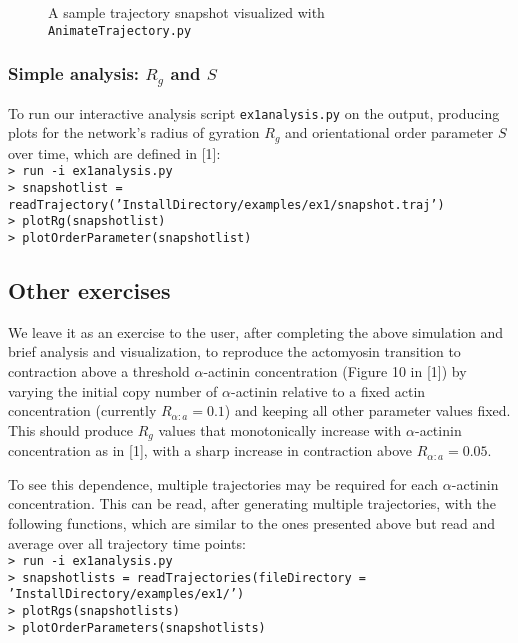 \documentclass[11pt, oneside]{article}   	%
\begin{document}
\begin{figure}[h]
\caption{A sample trajectory snapshot visualized with \texttt{AnimateTrajectory.py}}
\centering
\end{figure}

\subsubsection{Simple analysis: $R_g$ and $S$}

To run our interactive analysis script \texttt{ex1analysis.py} on the output, producing plots for the network's radius of gyration $R_g$ and orientational order parameter $S$ over time, which are defined in [1]:\\

\indent \texttt{> run -i ex1analysis.py}\\
\indent \texttt{> snapshotlist = readTrajectory('InstallDirectory/examples/ex1/snapshot.traj')}\\
\indent \texttt{> plotRg(snapshotlist)}\\
\indent \texttt{> plotOrderParameter(snapshotlist)}\\

\subsection{Other exercises}

We leave it as an exercise to the user, after completing the above simulation and brief analysis and visualization, to reproduce the actomyosin transition to contraction above a threshold $\alpha$-actinin concentration (Figure 10 in [1]) by varying the initial copy number of $\alpha$-actinin relative to a fixed actin concentration (currently $R_{\alpha:a}=0.1$) and keeping all other parameter values fixed. This should produce $R_g$ values that monotonically increase with $\alpha$-actinin concentration as in [1], with a sharp increase in contraction above $R_{\alpha:a}=0.05$.

To see this dependence, multiple trajectories may be required for each $\alpha$-actinin concentration. This can be read, after generating multiple trajectories, with the following functions, which are similar to the ones presented above but read and average over all trajectory time points:\\

\indent \texttt{> run -i ex1analysis.py}\\
\indent \texttt{> snapshotlists = readTrajectories(fileDirectory = 'InstallDirectory/examples/ex1/')}\\
\indent \texttt{> plotRgs(snapshotlists)}\\
\indent \texttt{> plotOrderParameters(snapshotlists)}\\
\end{document}
